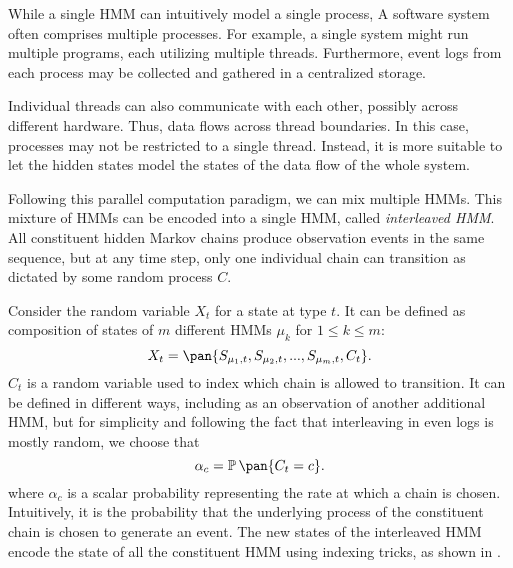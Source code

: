 While a single HMM can intuitively model a single process, A software system often comprises multiple processes. For example, a single system might run multiple programs, each utilizing multiple threads. Furthermore, event logs from each process may be collected and gathered in a centralized storage. 

Individual threads can also communicate with each other, possibly across different hardware. Thus, data flows across thread boundaries. In this case, processes may not be restricted to a single thread. Instead, it is more suitable to let the hidden states model the states of the data flow of the whole system.

Following this parallel computation paradigm, we can mix multiple HMMs. This mixture of HMMs can be encoded into a single HMM, called \emph{interleaved HMM}\cite{Minot2014-gn}. All constituent hidden Markov chains produce observation events in the same sequence, but at any time step, only one individual chain can transition as dictated by some random process \(C\).

Consider the random variable \(X_t\) for a state at type \(t\). It can be defined as composition of states of \(m\) different HMMs \(\mu_k\) for \(1 \leq k \leq m\):
\begin{equation}\label{eq:state_encoding}
    X_t = \pan{S_{\mu_1,t}, S_{\mu_2,t}, ..., S_{\mu_m,t}, C_t}.
\end{equation}
\(C_t\) is a random variable used to index which chain is allowed to transition. It can be defined in different ways, including as an observation of another additional HMM, but for simplicity and following the fact that interleaving in even logs is mostly random, we choose that
\begin{equation}
    \alpha_c = \prob\pan{C_t = c}.
\end{equation}
where \(\alpha_c\) is a scalar probability representing the rate at which a chain is chosen. Intuitively, it is the probability that the underlying process of the constituent chain is chosen to generate an event. The new states of the interleaved HMM encode the state of all the constituent HMM using indexing tricks, as shown in \cite{Minot2014-gn}.

